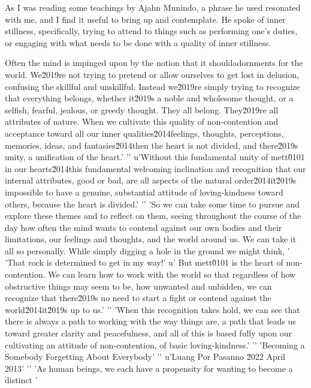 
As I was reading some teachings by Ajahn Munindo, a phrase he used 
resonated with me, and I find it useful to bring up and contemplate. He 
spoke of inner stillness, specifically, trying to attend to things such 
as performing one's duties, or engaging with what needs to be done with 
a quality of inner stillness.

Often the mind is impinged upon by the notion that it shouldadornments for the world. We\u2019re not trying to pretend or allow ourselves to get lost in delusion, confusing the skillful and unskillful. Instead we\u2019re simply trying to recognize that everything belongs, whether it\u2019s a noble and wholesome thought, or a selfish, fearful, jealous, or greedy thought. They all belong. They\u2019re all attributes of nature. When we cultivate this quality of non-contention and acceptance toward all our inner qualities\u2014feelings, thoughts, perceptions, memories, ideas, and fantasies\u2014then the heart is not divided, and there\u2019s unity, a unification of the heart.'
'\n'
u'Without this fundamental unity of mett\u0101 in our hearts\u2014this fundamental welcoming inclination and recognition that our internal attributes, good or bad, are all aspects of the natural order\u2014it\u2019s impossible to have a genuine, substantial attitude of loving-kindness toward others, because the heart is divided.'
'\n'
'So we can take some time to pursue and explore these themes and to reflect on them, seeing throughout the course of the day how often the mind wants to contend against our own bodies and their limitations, our feelings and thoughts, and the world around us. We can take it all so personally. While simply digging a hole in the ground we might think, '
'That rock is determined to get in my way!'
u' But mett\u0101 is the heart of non-contention. We can learn how to work with the world so that regardless of how obstructive things may seem to be, how unwanted and unbidden, we can recognize that there\u2019s no need to start a fight or contend against the world\u2014it\u2019s up to us.'
'\n'
'When this recognition takes hold, we can see that there is always a path to working with the way things are, a path that leads us toward greater clarity and peacefulness, and all of this is based fully upon our cultivating an attitude of non-contention, of basic loving-kindness.'
'\n'
'Becoming a Somebody Forgetting About Everybody'
'\n'
u'Luang Por Pasanno \u2022 April 2013'
'\n'
'As human beings, we each have a propensity for wanting to become a distinct '
